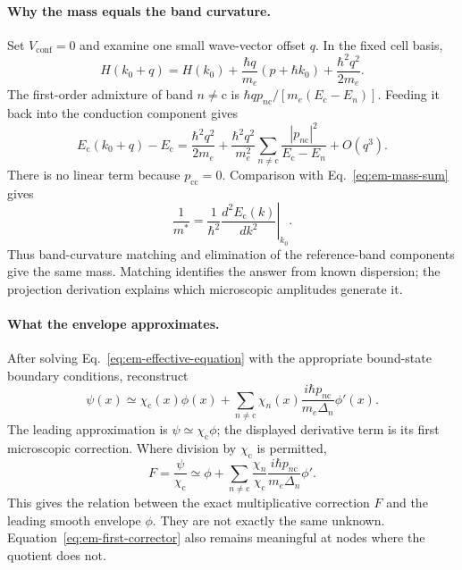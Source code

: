 \paragraph{Why the mass equals the band curvature.}
Set $V_{\mathrm{conf}}=0$ and examine one small wave-vector
offset $q$. In the fixed cell basis,
\begin{equation}
  H(k_0+q)=H(k_0)+\frac{\hbar q}{m_e}(p+\hbar k_0)
                       +\frac{\hbar^2q^2}{2m_e}.
  \label{eq:em-kp-expansion}
\end{equation}
The first-order admixture of band $n\ne\mathrm c$ is
$\hbar q p_{n\mathrm c}/[m_e(E_{\mathrm c}-E_n)]$.
Feeding it back into the conduction component gives
\begin{equation}
  E_{\mathrm c}(k_0+q)-E_{\mathrm c}
     =\frac{\hbar^2q^2}{2m_e}
       +\frac{\hbar^2q^2}{m_e^2}
          \sum_{n\ne\mathrm c}
             \frac{|p_{n\mathrm c}|^2}{E_{\mathrm c}-E_n}
       +O(q^3).
  \label{eq:em-derived-dispersion}
\end{equation}
There is no linear term because $p_{\mathrm{cc}}=0$.
Comparison with Eq.~\eqref{eq:em-mass-sum} gives
\begin{equation}
  \frac1{m^*}=\frac1{\hbar^2}
       \left.\frac{d^2E_{\mathrm c}(k)}{dk^2}\right|_{k_0}.
  \label{eq:em-curvature-mass}
\end{equation}
Thus band-curvature matching and elimination of the reference-band
components give the same mass. Matching identifies the answer
from known dispersion; the projection derivation explains
which microscopic amplitudes generate it.

\paragraph{What the envelope approximates.}
After solving Eq.~\eqref{eq:em-effective-equation} with the
appropriate bound-state boundary conditions, reconstruct
\begin{equation}
  \psi(x)\simeq\chi_{\mathrm c}(x)\phi(x)
      +\sum_{n\ne\mathrm c}\chi_n(x)
          \frac{i\hbar p_{n\mathrm c}}{m_e\Delta_n}\phi'(x).
  \label{eq:em-first-corrector}
\end{equation}
The leading approximation is $\psi\simeq\chi_{\mathrm c}\phi$;
the displayed derivative term is its first microscopic correction.
Where division by $\chi_{\mathrm c}$ is permitted,
\begin{equation}
  F=\frac{\psi}{\chi_{\mathrm c}}
    \simeq\phi+\sum_{n\ne\mathrm c}
       \frac{\chi_n}{\chi_{\mathrm c}}
       \frac{i\hbar p_{n\mathrm c}}{m_e\Delta_n}\phi'.
  \label{eq:em-quotient-reconstruction}
\end{equation}
This gives the relation between the exact multiplicative
correction $F$ and the leading smooth envelope $\phi$.
They are not exactly the same unknown. Equation~\eqref{eq:em-first-corrector}
also remains meaningful at nodes where the quotient does not.

